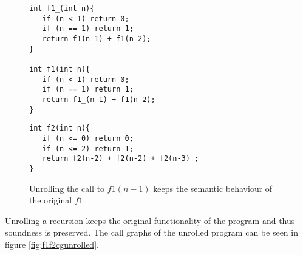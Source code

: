 \begin{figure}[h]
\begin{center}
\begin{minipage}{7 cm}
\begin{lstlisting}
int f1_(int n){
   if (n < 1) return 0;
   if (n == 1) return 1; 
   return f1(n-1) + f1(n-2);
}

int f1(int n){
   if (n < 1) return 0;
   if (n == 1) return 1; 
   return f1_(n-1) + f1(n-2);
}
\end{lstlisting}
\end{minipage}
\begin{minipage}{7 cm}
\begin{lstlisting}
int f2(int n){
   if (n <= 0) return 0;
   if (n <= 2) return 1;
   return f2(n-2) + f2(n-2) + f2(n-3) ;
}
\end{lstlisting}
\end{minipage}
\caption{Unrolling the call to $f1(n-1)$ keeps the semantic behaviour of the original $f1$.}
\label{fig:f1f2unrolled}
\end{center}
\end{figure}
 Unrolling a recursion keeps the original functionality of the program and thus soundness is preserved. The call graphs of the unrolled program can be seen in figure \ref{fig:f1f2cgunrolled}. 
